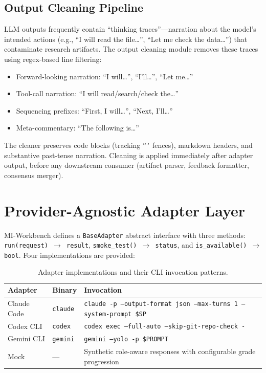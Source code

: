 \documentclass[10pt]{article}
\begin{document}
\subsection{Output Cleaning Pipeline}

LLM outputs frequently contain ``thinking traces''---narration about the model's intended actions (e.g., ``I will read the file\ldots'', ``Let me check the data\ldots'') that contaminate research artifacts. The output cleaning module removes these traces using regex-based line filtering:

\begin{itemize}
  \item Forward-looking narration: ``I will\ldots'', ``I'll\ldots'', ``Let me\ldots''
  \item Tool-call narration: ``I will read/search/check the\ldots''
  \item Sequencing prefixes: ``First, I will\ldots'', ``Next, I'll\ldots''
  \item Meta-commentary: ``The following is\ldots''
\end{itemize}

The cleaner preserves code blocks (tracking \texttt{```} fences), markdown headers, and substantive past-tense narration. Cleaning is applied immediately after adapter output, before any downstream consumer (artifact parser, feedback formatter, consensus merger).


\section{Provider-Agnostic Adapter Layer}
\label{sec:adapters}

MI-Workbench defines a \texttt{BaseAdapter} abstract interface with three methods: \texttt{run(request) $\to$ result}, \texttt{smoke\_test() $\to$ status}, and \texttt{is\_available() $\to$ bool}. Four implementations are provided:

\begin{table}[t]
\centering
\small
\caption{Adapter implementations and their CLI invocation patterns.}
\label{tab:adapters}
\begin{tabular}{@{}llp{4.8cm}@{}}
\toprule
\textbf{Adapter} & \textbf{Binary} & \textbf{Invocation} \\
\midrule
Claude Code & \texttt{claude} & \texttt{claude -p --output-format json --max-turns 1 --system-prompt \$SP} \\
Codex CLI & \texttt{codex} & \texttt{codex exec --full-auto --skip-git-repo-check -} \\
Gemini CLI & \texttt{gemini} & \texttt{gemini --yolo -p \$PROMPT} \\
Mock & --- & Synthetic role-aware responses with configurable grade progression \\
\bottomrule
\end{tabular}
\end{table}
\end{document}
